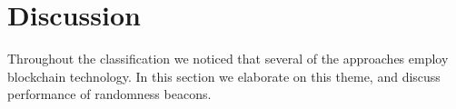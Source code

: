 \section{Discussion}\label{sec:discussion}

Throughout the classification we noticed that several of the approaches employ blockchain technology.
In this section we elaborate on this theme, and discuss performance of randomness beacons.

